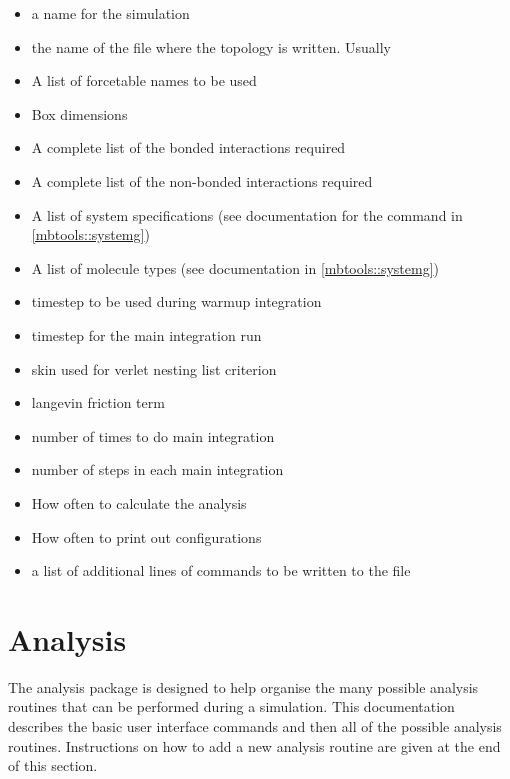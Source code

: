 \begin{itemize}
    \item {} a name for the simulation
    \item {} the name of the file where the topology is written. Usually 
    \item {} A list of forcetable names to be used
    \item {} Box dimensions
    \item {} A complete list of the bonded interactions required
    \item {} A complete list of the non-bonded interactions required
    \item {} A list of system specifications (see documentation for the  command in \ref{mbtools::systemg})
    \item {} A list of molecule types (see documentation in \ref{mbtools::systemg})
    \item {} timestep to be used during warmup integration
    \item {} timestep for the main integration run
    \item {} skin used for verlet nesting list criterion
    \item {} langevin friction term
    \item {} number of times to do main integration
    \item {} number of steps in each main integration
    \item {} How often to calculate the analysis
    \item {} How often to print out configurations
    \item {} a list of additional lines of commands to be written to the  file

\end{itemize}

\section{Analysis}

The analysis package is designed to help organise the many possible analysis routines that can be performed during a simulation. This documentation describes the basic user interface commands and then all of the possible analysis routines. Instructions on how to add a new analysis routine are given at the end of this section.

